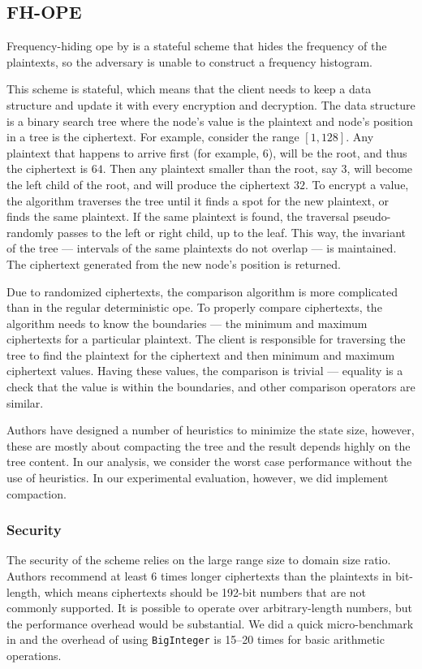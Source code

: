 \subsection{FH-OPE}

	Frequency-hiding \acrshort{ope} by \textcite{fh-ope} is a stateful scheme that hides the frequency of the plaintexts, so the adversary is unable to construct a frequency histogram.

	This scheme is stateful, which means that the client needs to keep a data structure and update it with every encryption and decryption.
	The data structure is a binary search tree where the node's value is the plaintext and node's position in a tree is the ciphertext.
	For example, consider the range $[1, 128]$.
	Any plaintext that happens to arrive first (for example, $6$), will be the root, and thus the ciphertext is $64$.
	Then any plaintext smaller than the root, say $3$, will become the left child of the root, and will produce the ciphertext $32$.
	To encrypt a value, the algorithm traverses the tree until it finds a spot for the new plaintext, or finds the same plaintext.
	If the same plaintext is found, the traversal pseudo-randomly passes to the left or right child, up to the leaf.
	This way, the invariant of the tree --- intervals of the same plaintexts do not overlap --- is maintained.
	The ciphertext generated from the new node's position is returned.

	Due to randomized ciphertexts, the comparison algorithm is more complicated than in the regular deterministic \acrshort{ope}.
	To properly compare ciphertexts, the algorithm needs to know the boundaries --- the minimum and maximum ciphertexts for a particular plaintext.
	The client is responsible for traversing the tree to find the plaintext for the ciphertext and then minimum and maximum ciphertext values.
	Having these values, the comparison is trivial --- equality is a check that the value is within the boundaries, and other comparison operators are similar.

	Authors have designed a number of heuristics to minimize the state size, however, these are mostly about compacting the tree and the result depends highly on the tree content.
	In our analysis, we consider the worst case performance without the use of heuristics.
	In our experimental evaluation, however, we did implement compaction.

	\subsubsection{Security}
		The security of the scheme relies on the large range size to domain size ratio.
		Authors recommend at least 6 times longer ciphertexts than the plaintexts in bit-length, which means ciphertexts should be 192-bit numbers that are not commonly supported.
		It is possible to operate over arbitrary-length numbers, but the performance overhead would be substantial.
		We did a quick micro-benchmark in {\Csharp} and the overhead of using \texttt{BigInteger} is 15--20 times for basic arithmetic operations.

